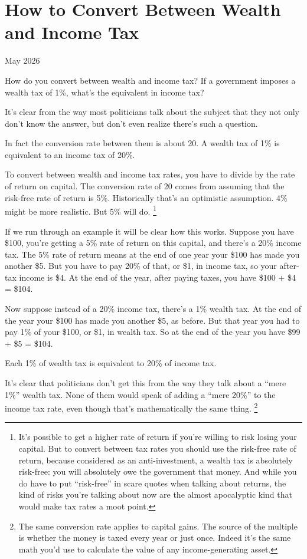 \chapter{How to Convert Between Wealth and Income Tax}

May 2026

How do you convert between wealth and income tax? If a government
imposes a wealth tax of 1\%, what's the equivalent in income tax?

It's clear from the way most politicians talk about the subject that
they not only don't know the answer, but don't even realize there's such
a question.

In fact the conversion rate between them is about 20. A wealth tax of
1\% is equivalent to an income tax of 20\%.

To convert between wealth and income tax rates, you have to divide by
the rate of return on capital. The conversion rate of 20 comes from
assuming that the risk-free rate of return is 5\%. Historically that's
an optimistic assumption. 4\% might be more realistic. But 5\% will do.
\footnote{It's possible to get a higher rate of return if you're willing
to risk losing your capital. But to convert between tax rates you should
use the risk-free rate of return, because considered as an
anti-investment, a wealth tax is absolutely risk-free: you will
absolutely owe the government that money. And while you do have to put
``risk-free'' in scare quotes when talking about returns, the kind of
risks you're talking about now are the almost apocalyptic kind that
would make tax rates a moot point.}

If we run through an example it will be clear how this works. Suppose
you have \$100, you're getting a 5\% rate of return on this capital, and
there's a 20\% income tax. The 5\% rate of return means at the end of
one year your \$100 has made you another \$5. But you have to pay 20\%
of that, or \$1, in income tax, so your after-tax income is \$4. At the
end of the year, after paying taxes, you have \$100 + \$4 = \$104.

Now suppose instead of a 20\% income tax, there's a 1\% wealth tax. At
the end of the year your \$100 has made you another \$5, as before. But
that year you had to pay 1\% of your \$100, or \$1, in wealth tax. So at
the end of the year you have \$99 + \$5 = \$104.

Each 1\% of wealth tax is equivalent to 20\% of income tax.

It's clear that politicians don't get this from the way they talk about
a ``mere 1\%'' wealth tax. None of them would speak of adding a ``mere
20\%'' to the income tax rate, even though that's mathematically the
same thing. \footnote{The same conversion rate applies to capital gains. The source of
the multiple is whether the money is taxed every year or just once.
Indeed it's the same math you'd use to calculate the value of any
income-generating asset.}

